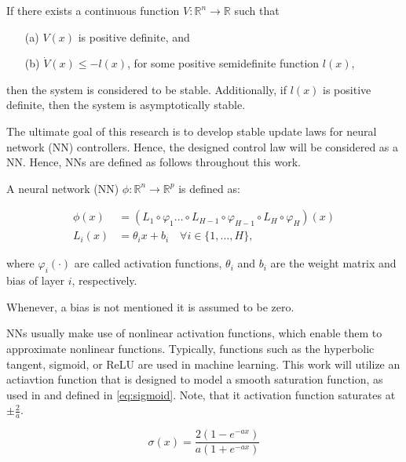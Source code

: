 \begin{definition}
    If there exists a continuous function $V: \mathbb{R}^n \rightarrow \mathbb{R}$ such that
     \begin{enumerate}
       \item[(a)] $V(x)$ is positive definite, and
       \item[(b)] $\dot{V}(x)\leq-l(x)$, for some positive semidefinite function $l(x)$,
     \end{enumerate}
    then the system is considered to be stable. Additionally, if $l(x)$ is positive definite, then the system is asymptotically stable.
     \label{def:lyapunov-stability}
\end{definition}

The ultimate goal of this research is to develop stable update laws for neural network (NN) controllers. Hence, the designed control law will be considered as a NN. Hence, NNs are defined as follows throughout this work.

\begin{definition}
    A neural network (NN) $\phi:\mathbb{R}^n\rightarrow \mathbb{R}^p$ is defined as:
   
     \begin{equation}
      \begin{aligned}
        \phi (x) & = (L_1 \circ \varphi_1 \dots \circ L_{H-1} \circ \varphi_{H-1} \circ L_{H} \circ \varphi_H)(x)\\
        L_i(x) &= \theta_i x + b_i \quad \forall i\in\{1,..., H\},
      \end{aligned}
    \end{equation}
  
     where $\varphi_i(\cdot)$ are called  activation functions, $\theta_i$ and $b_i$ are the weight matrix and bias of layer $i$, respectively.
\end{definition}
Whenever, a bias is not mentioned it is assumed to be zero.

NNs usually make use of nonlinear activation functions, which enable them to approximate nonlinear functions. Typically, functions such as the hyperbolic tangent, sigmoid, or ReLU are used in machine learning. This work will utilize an actiavtion function that is designed to model a smooth saturation function, as used in \cite{wahby, thanhNonlinearPIDControl2006} and defined in \eqref{eq:sigmoid}. Note, that it activation function saturates at $\pm \frac{2}{a}$.

\begin{equation}
    \sigma (x) = \frac{2(1-e^{-ax})}{a(1+e^{-ax})}
    \label{eq:sigmoid}
\end{equation}

